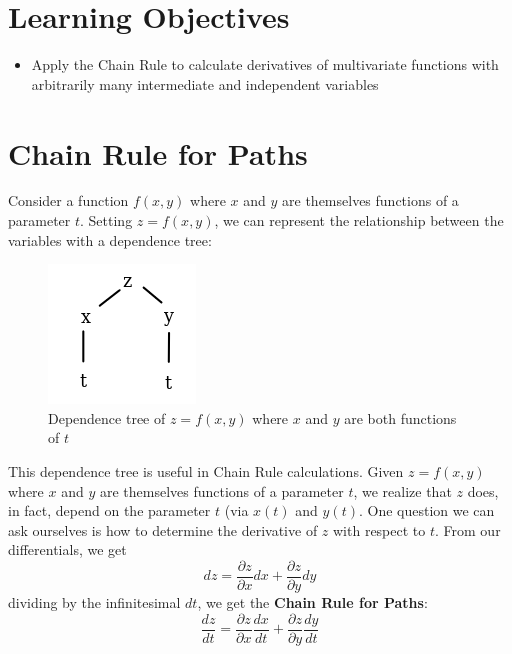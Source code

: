 \documentclass[
]{book}
\providecommand{\tightlist}{%
  \setlength{\itemsep}{0pt}\setlength{\parskip}{0pt}}
\theoremstyle{definition}
\theoremstyle{definition}
\theoremstyle{definition}
\theoremstyle{definition}
\theoremstyle{remark}
\begin{document}
\hypertarget{learning-objectives-5}{%
\section{Learning Objectives}\label{learning-objectives-5}}

\begin{itemize}
\tightlist
\item
  Apply the Chain Rule to calculate derivatives of multivariate functions with arbitrarily many intermediate and independent variables
\end{itemize}

\hypertarget{chain-rule-for-paths}{%
\section{Chain Rule for Paths}\label{chain-rule-for-paths}}

Consider a function \(f(x,y)\) where \(x\) and \(y\) are themselves functions of a parameter \(t\). Setting \(z=f(x,y)\), we can represent the relationship between the variables with a dependence tree:

\begin{figure}

{\centering \includegraphics[width=0.2\linewidth]{images/basic-dt} 

}

\caption{Dependence tree of $z=f(x,y)$ where $x$ and $y$ are both functions of $t$}\label{fig:unnamed-chunk-12}
\end{figure}

This dependence tree is useful in Chain Rule calculations. Given \(z=f(x,y)\) where \(x\) and \(y\) are themselves functions of a parameter \(t\), we realize that \(z\) does, in fact, depend on the parameter \(t\) (via \(x(t)\) and \(y(t)\). One question we can ask ourselves is how to determine the derivative of \(z\) with respect to \(t\). From our differentials, we get \[dz=\dfrac{\partial z}{\partial x}dx + \dfrac{\partial z}{\partial y}dy\]
dividing by the infinitesimal \(dt\), we get the \textbf{Chain Rule for Paths}: \[\dfrac{dz}{dt}=\dfrac{\partial z}{\partial x}\dfrac{dx}{dt}+\dfrac{\partial z}{\partial y}\dfrac{dy}{dt}\]
\end{document}
